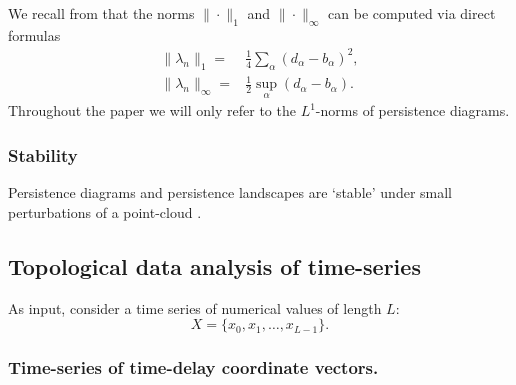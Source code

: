 \documentclass[11pt]{amsart}
\theoremstyle{definition}
\theoremstyle{remark}
\numberwithin{equation}{section}
\begin{document}
We recall from \cite{bubenik2015statistical,bubenik2017persistence} that the norms $\|\cdot\|_1$ and  $\|\cdot\|_\infty$ can be computed via direct formulas
\begin{equation}
\begin{split}
\|\lambda_n\|_1=&\frac{1}{4} \sum_{\alpha} (d_\alpha-b_\alpha)^2,\\
\|\lambda_n\|_\infty=&\frac{1}{2} \sup_{\alpha}(d_\alpha-b_\alpha).
\end{split}
\end{equation}
Throughout the paper we will only refer to the $L^1$-norms of persistence diagrams.


\subsubsection{Stability}  Persistence diagrams and persistence landscapes  are `stable' under small perturbations of a point-cloud \cite{chazal2014persistence,bubenik2015statistical}.

\subsection{Topological data analysis of time-series}
\label{sec:TDA_time_series}
As input, consider a  time series of  numerical values of length $L$:
\begin{equation}\label{eqn:X}X=\{x_0,x_1,\ldots, x_{L-1} \}.\end{equation}


\subsubsection{Time-series of time-delay coordinate vectors.}
\end{document}
